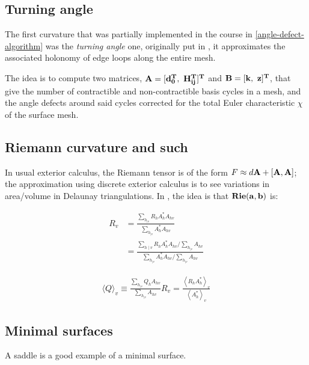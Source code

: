 \subsection{Turning angle}

The first curvature that was partially implemented in the course in
\ref{angle-defect-algorithm} was the \textit{turning angle} one, 
originally put in \cite{Crane:2010:TCD}, it approximates the associated
holonomy of edge loops along the entire mesh.

\spa

The idea is to compute two matrices, $\bf{A} = [d_0^T, \ H_{ij}^T]^T$
and $\bf{B} = [k, \ z]^T$, that give the number of contractible
and non-contractible basis cycles in a mesh, and the angle defects 
around said cycles corrected for the total Euler characteristic $\chi$
of the surface mesh.


\subsection{Riemann curvature and such}

In usual exterior calculus, the Riemann tensor is of the form
$F \approx d\bf{A} + \bf{[A,A]}$; the approximation using
discrete exterior calculus is to see variations in area/volume
in Delaunay triangulations. In \cite{exterior_calculus1},
the idea is that $\bf{Rie(a,b)}$ is:

\begin{align*}
R_v&=\frac{\sum_{h_{\mid v}} R_h A_h^* A_{h v}}{\sum_{h_{\mid v}} A_h^* A_{h v}} \\
 &=\frac{\sum_{h \mid v} R_h A_h^* A_{h v} / \sum_{h_{\mid v}} A_{h v}}{\sum_{h_{\mid v}} A_h^* A_{h v} / \sum_{h_{\mid v}} A_{h v}}
\end{align*}

\begin{align*}
\langle Q\rangle_v \equiv \frac{\sum_{h_{\mid v}} Q_h A_{h v}}{\sum_{h_{\mid v}} A_{h v}}
R_v=\frac{\left\langle R_h A_h^*\right\rangle_v}{\left\langle A_h^*\right\rangle_v}
\end{align*}

\subsection{Minimal surfaces}

A saddle is a good example of a minimal surface.
\cite{bouma2001}